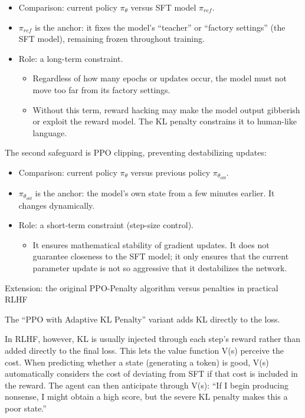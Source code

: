 \begin{itemize}
\tightlist
\item
  Comparison: current policy \(\pi_\theta\) versus SFT model \(\pi_{ref}\).
\item
  \(\pi_{ref}\) is the anchor: it fixes the model's ``teacher'' or ``factory settings'' (the SFT model), remaining frozen throughout training.
\item
  Role: a long-term constraint.

  \begin{itemize}
  \tightlist
  \item
    Regardless of how many epochs or updates occur, the model must not move too far from its factory settings.
  \item
    Without this term, reward hacking may make the model output gibberish or exploit the reward model. The KL penalty constrains it to human-like language.
  \end{itemize}
\end{itemize}

The second safeguard is PPO clipping, preventing destabilizing updates:

\begin{itemize}
\tightlist
\item
  Comparison: current policy \(\pi_\theta\) versus previous policy \(\pi_{\theta_{old}}\).
\item
  \(\pi_{\theta_{old}}\) is the anchor: the model's own state from a few minutes earlier. It changes dynamically.
\item
  Role: a short-term constraint (step-size control).

  \begin{itemize}
  \tightlist
  \item
    It ensures mathematical stability of gradient updates. It does not guarantee closeness to the SFT model; it only ensures that the current parameter update is not so aggressive that it destabilizes the network.
  \end{itemize}
\end{itemize}

Extension: the original PPO-Penalty algorithm versus penalties in practical RLHF

The ``PPO with Adaptive KL Penalty'' variant adds KL directly to the loss.

In RLHF, however, KL is usually injected through each step's reward rather than added directly to the final loss. This lets the value function V(s) perceive the cost. When predicting whether a state (generating a token) is good, V(s) automatically considers the cost of deviating from SFT if that cost is included in the reward. The agent can then anticipate through V(s): ``If I begin producing nonsense, I might obtain a high score, but the severe KL penalty makes this a poor state.''

